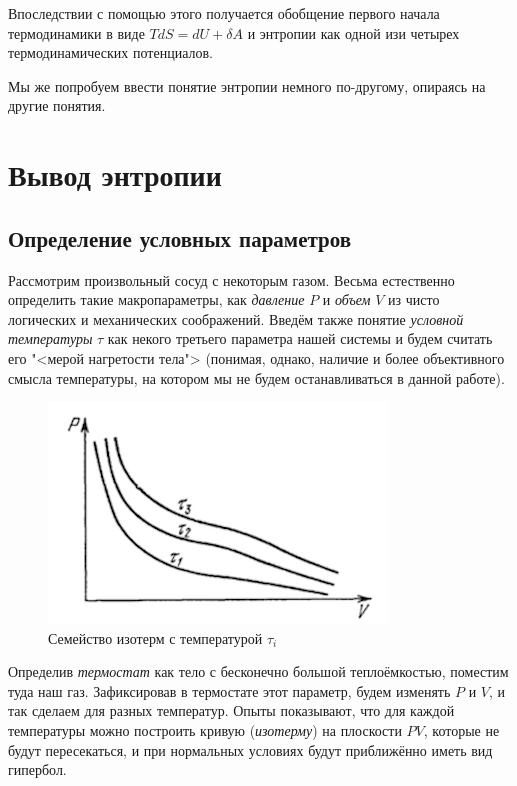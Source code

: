 \documentclass[12pt]{kiarticle}
\newcommand{\del}{\ensuremath{\delta}}
\begin{document}
Впоследствии с помощью этого получается обобщение первого начала термодинамики в виде $ TdS = dU + \del A $ и энтропии как одной изи четырех термодинамических потенциалов. 

Мы же попробуем ввести понятие энтропии немного по-другому, опираясь на другие понятия.

\section{Вывод энтропии}

\subsection{Определение условных параметров} \label{ifTS}

Рассмотрим произвольный сосуд с некоторым газом. Весьма естественно определить такие макропараметры, как \textit{давление} $ P $ и \textit{объем} $ V $ из чисто логических и механических соображений. Введём также понятие \textit{условной температуры} $ \tau $ как некого третьего параметра нашей системы и будем считать его "<мерой нагретости тела"> (понимая, однако, наличие и более объективного смысла температуры, на котором мы не будем останавливаться в данной работе). 

 \begin{figure} 
	\includegraphics{tempdef}
	\caption{Семейство изотерм с температурой $ \tau_i $}
\end{figure}

Определив \textit{термостат} как тело с бесконечно большой теплоёмкостью, поместим туда наш газ. Зафиксировав в термостате этот параметр, будем изменять $ P $ и $ V $, и так сделаем для разных температур. Опыты показывают, что для каждой температуры можно построить кривую (\textit{изотерму}) на плоскости $ PV $, которые не будут пересекаться, и при нормальных условиях будут приближённо иметь вид гипербол. 
\end{document}
